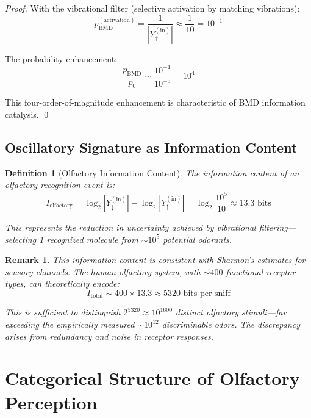 \documentclass[12pt,a4paper]{article}
\newtheorem{definition}{Definition}
\newtheorem{remark}{Remark}
\begin{document}
\begin{proof}
With the vibrational filter (selective activation by matching vibrations):
\begin{equation}
p_{\text{BMD}}^{(\text{activation})} = \frac{1}{|Y_{\uparrow}^{(\text{in})}|} \approx \frac{1}{10} = 10^{-1}
\end{equation}

The probability enhancement:
\begin{equation}
\frac{p_{\text{BMD}}}{p_0} \sim \frac{10^{-1}}{10^{-5}} = 10^4
\end{equation}

This four-order-of-magnitude enhancement is characteristic of BMD information catalysis. \qed
\end{proof}

\subsection{Oscillatory Signature as Information Content}

\begin{definition}[Olfactory Information Content]
\label{def:olfactory_information}
The information content of an olfactory recognition event is:
\begin{equation}
I_{\text{olfactory}} = \log_2 |Y_{\downarrow}^{(\text{in})}| - \log_2 |Y_{\uparrow}^{(\text{in})}| = \log_2 \frac{10^5}{10} \approx 13.3 \text{ bits}
\end{equation}

This represents the reduction in uncertainty achieved by vibrational filtering—selecting 1 recognized molecule from $\sim 10^5$ potential odorants.
\end{definition}

\begin{remark}
This information content is consistent with Shannon's estimates for sensory channels. The human olfactory system, with $\sim 400$ functional receptor types, can theoretically encode:
\begin{equation}
I_{\text{total}} \sim 400 \times 13.3 \approx 5320 \text{ bits per sniff}
\end{equation}

This is sufficient to distinguish $2^{5320} \approx 10^{1600}$ distinct olfactory stimuli—far exceeding the empirically measured $\sim 10^{12}$ discriminable odors. The discrepancy arises from redundancy and noise in receptor responses.
\end{remark}

\section{Categorical Structure of Olfactory Perception}
\end{document}
